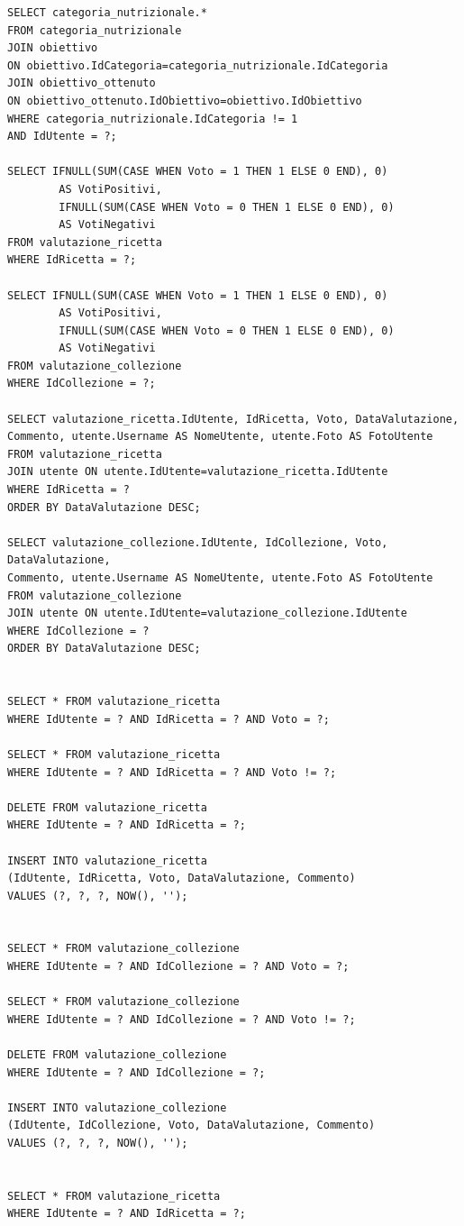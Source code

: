 ﻿\documentclass[a4paper,12pt]{report}
\begin{document}
\begin{verbatim}
SELECT categoria_nutrizionale.*
FROM categoria_nutrizionale
JOIN obiettivo
ON obiettivo.IdCategoria=categoria_nutrizionale.IdCategoria
JOIN obiettivo_ottenuto
ON obiettivo_ottenuto.IdObiettivo=obiettivo.IdObiettivo
WHERE categoria_nutrizionale.IdCategoria != 1
AND IdUtente = ?;

SELECT IFNULL(SUM(CASE WHEN Voto = 1 THEN 1 ELSE 0 END), 0)
        AS VotiPositivi,
        IFNULL(SUM(CASE WHEN Voto = 0 THEN 1 ELSE 0 END), 0)
        AS VotiNegativi
FROM valutazione_ricetta
WHERE IdRicetta = ?;

SELECT IFNULL(SUM(CASE WHEN Voto = 1 THEN 1 ELSE 0 END), 0)
        AS VotiPositivi,
        IFNULL(SUM(CASE WHEN Voto = 0 THEN 1 ELSE 0 END), 0)
        AS VotiNegativi
FROM valutazione_collezione
WHERE IdCollezione = ?;

SELECT valutazione_ricetta.IdUtente, IdRicetta, Voto, DataValutazione,
Commento, utente.Username AS NomeUtente, utente.Foto AS FotoUtente
FROM valutazione_ricetta
JOIN utente ON utente.IdUtente=valutazione_ricetta.IdUtente
WHERE IdRicetta = ?
ORDER BY DataValutazione DESC;

SELECT valutazione_collezione.IdUtente, IdCollezione, Voto, DataValutazione, 
Commento, utente.Username AS NomeUtente, utente.Foto AS FotoUtente
FROM valutazione_collezione
JOIN utente ON utente.IdUtente=valutazione_collezione.IdUtente
WHERE IdCollezione = ?
ORDER BY DataValutazione DESC;


SELECT * FROM valutazione_ricetta
WHERE IdUtente = ? AND IdRicetta = ? AND Voto = ?;

SELECT * FROM valutazione_ricetta
WHERE IdUtente = ? AND IdRicetta = ? AND Voto != ?;

DELETE FROM valutazione_ricetta
WHERE IdUtente = ? AND IdRicetta = ?;

INSERT INTO valutazione_ricetta
(IdUtente, IdRicetta, Voto, DataValutazione, Commento)
VALUES (?, ?, ?, NOW(), '');


SELECT * FROM valutazione_collezione
WHERE IdUtente = ? AND IdCollezione = ? AND Voto = ?;

SELECT * FROM valutazione_collezione
WHERE IdUtente = ? AND IdCollezione = ? AND Voto != ?;

DELETE FROM valutazione_collezione
WHERE IdUtente = ? AND IdCollezione = ?;

INSERT INTO valutazione_collezione
(IdUtente, IdCollezione, Voto, DataValutazione, Commento)
VALUES (?, ?, ?, NOW(), '');


SELECT * FROM valutazione_ricetta
WHERE IdUtente = ? AND IdRicetta = ?;


\end{verbatim}
\end{document}
